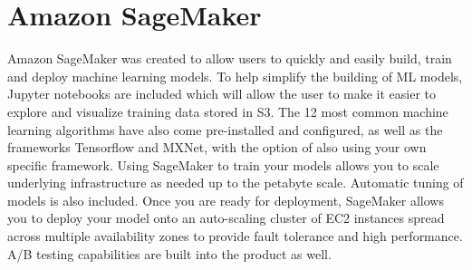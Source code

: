 \section{Amazon SageMaker}

Amazon SageMaker \cite{hid-sp18-521-Sagemaker} was created to allow users 
to quickly and easily build, train and deploy machine learning models. 
To help simplify the building of ML models, Jupyter notebooks are included
which will allow the user to make it easier to explore and visualize 
training data stored in S3. The 12 most common machine learning algorithms
have also come pre-installed and configured, as well as the frameworks 
Tensorflow and MXNet, with the option of also using your own specific 
framework. Using SageMaker to train your models allows you to scale 
underlying infrastructure as needed up to the petabyte scale. Automatic 
tuning of models is also included. Once you are ready for deployment, 
SageMaker allows you to deploy your model onto an auto-scaling cluster 
of EC2 instances spread across multiple availability zones to provide 
fault tolerance and high performance. A/B testing capabilities are built
into the product as well. 
